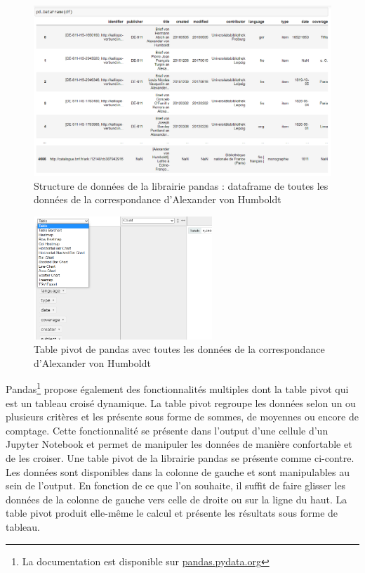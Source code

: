 \documentclass[a4paper, 12pt, twoside]{book}
\begin{document}
\begin{figure}[h!]
\centering
\includegraphics[scale=0.5]{img/dataFrameAllData.png}
\caption{Structure de données de la librairie pandas : dataframe de toutes les données de la correspondance d'Alexander von Humboldt}
\label{fig:DataFrame}
\end{figure}

\begin{figure}
\includegraphics[width=0.6\textwidth]{img/pivot.png}
\caption{Table pivot de pandas avec toutes les données de la correspondance d'Alexander von Humboldt}
\vspace{-10pt}
\end{figure}

Pandas\footnote{La documentation est disponible sur \href{https://pandas.pydata.org/}{pandas.pydata.org}} propose également des fonctionnalités multiples dont la table pivot qui est un tableau croisé dynamique. La table pivot regroupe les données selon un ou plusieurs critères et les présente sous forme de sommes, de moyennes ou encore de comptage. Cette fonctionnalité se présente dans l'output d'une cellule d'un Jupyter Notebook et permet de manipuler les données de manière confortable et de les croiser. Une table pivot de la librairie pandas se présente comme ci-contre. Les données sont disponibles dans la colonne de gauche et sont manipulables au sein de l'output. En fonction de ce que l'on souhaite, il suffit de faire glisser les données de la colonne de gauche vers celle de droite ou sur la ligne du haut. La table pivot produit elle-même le calcul et présente les résultats sous forme de tableau.
\end{document}
